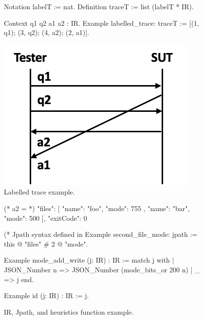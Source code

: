 \begin{figure}
\begin{minipage}{.6\textwidth}
\begin{coq}
Notation   labelT := nat.
Definition traceT := list (labelT * IR).

Context q1 q2 a1 a2 : IR.
Example labelled_trace: traceT :=
  [(1, q1); (3, q2); (4, a2); (2, a1)].
\end{coq}
\end{minipage}\begin{minipage}{.3\textwidth}
  \includegraphics[width=\linewidth]{figures/ir-trace}
\end{minipage}
\caption{Labelled trace example.}
\label{fig:ir-trace}
\end{figure}

\begin{figure}
  \begin{minipage}[t]{.4\textwidth}
\begin{json}
  (* a2 = *)
  {
    "files": [
      {
        "name": "foo",
        "mode": 755
      },
      {
        "name": "bar",
        "mode": 500
      }
    ],
    "exitCode": 0
  }
\end{json}
  \end{minipage}\begin{minipage}[t]{.5\textwidth}
\begin{coq}
(* Jpath syntax defined in %
Example second_file_mode: jpath :=
  this @ "files" # 2 @ "mode".

Example mode_add_write (j: IR) : IR :=
  match j with
  | JSON_Number n =>
    JSON_Number (mode_bits_or 200 n)
  | _ => j
  end.

Example id (j: IR) : IR := j.
\end{coq}
  \end{minipage}
  \caption{IR, Jpath, and heuristics function example.}
  \label{fig:ir-jpath}
\end{figure}

